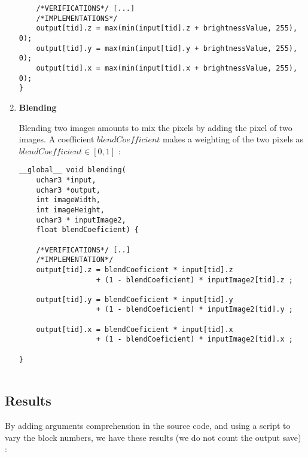 \documentclass{article}
\begin{document}
\begin{enumerate}
\begin{verbatim}
	/*VERIFICATIONS*/ [...]
	/*IMPLEMENTATIONS*/
	output[tid].z = max(min(input[tid].z + brightnessValue, 255), 0); 
	output[tid].y = max(min(input[tid].y + brightnessValue, 255), 0); 
	output[tid].x = max(min(input[tid].x + brightnessValue, 255), 0); 
}

    \end{verbatim}
    
    \item \textbf{Blending}
    
    Blending two images amounts to mix the pixels by adding the pixel of two images. A coefficient $blendCoefficient$ makes a weighting of the two pixels as $blendCoefficient \in [0,1]$ :
    
    \begin{verbatim}
__global__ void blending(
    uchar3 *input, 
    uchar3 *output, 
    int imageWidth, 
    int imageHeight, 
    uchar3 * inputImage2, 
    float blendCoeficient) {
	
	/*VERIFICATIONS*/ [..]
	/*IMPLEMENTATION*/
	output[tid].z = blendCoeficient * input[tid].z 
	              + (1 - blendCoeficient) * inputImage2[tid].z ;
	
	output[tid].y = blendCoeficient * input[tid].y 
	              + (1 - blendCoeficient) * inputImage2[tid].y ;
	
	output[tid].x = blendCoeficient * input[tid].x 
	              + (1 - blendCoeficient) * inputImage2[tid].x ;
	
}
    
    \end{verbatim}
    
    \end{enumerate}
    
\subsection{Results}

    By adding arguments comprehension in the source code, and using a script to vary the block numbers, we have these results (we do not count the output save) :
\end{document}
